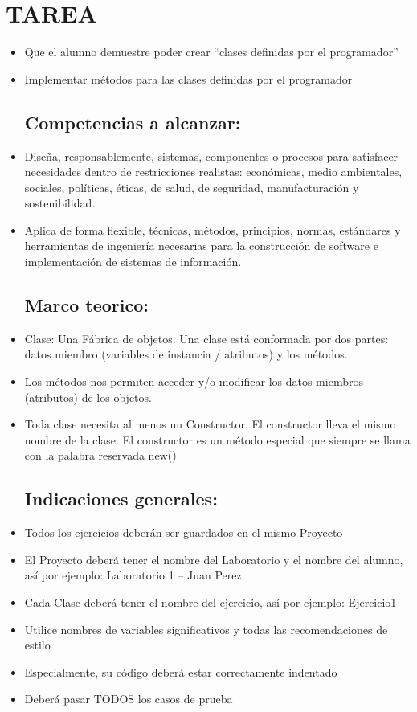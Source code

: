 \documentclass{article}
\begin{document}
    \section{TAREA}
	\begin{itemize}	
    \subsection{Objetivos:}
		\item Que el alumno demuestre poder crear  “clases definidas por el programador” 
		\item Implementar métodos para las clases definidas por el programador
       
    \subsection{Competencias a alcanzar:}
		\item Diseña, responsablemente, sistemas, componentes o procesos para satisfacer necesidades dentro de restricciones realistas: económicas, medio ambientales, sociales, políticas, éticas, de salud, de seguridad, manufacturación y sostenibilidad.
        \item Aplica de forma flexible, técnicas, métodos, principios, normas, estándares y herramientas de ingeniería necesarias para la construcción de software e implementación de sistemas de información.
    \subsection{Marco teorico:}
        \item Clase: Una Fábrica de objetos. Una clase está conformada por dos partes: datos miembro (variables de instancia / atributos) y los métodos. 
        \item Los métodos nos permiten acceder y/o modificar los datos miembros (atributos) de los objetos. 
        \item Toda clase necesita al menos un Constructor. El constructor lleva el mismo nombre de la clase. El constructor es un método especial que siempre se llama con la palabra reservada new() 
        
    \subsection{Indicaciones generales:}
        \item Todos los ejercicios deberán ser guardados en el mismo Proyecto
        \item El Proyecto deberá tener el nombre del Laboratorio y el nombre del alumno, así por ejemplo: Laboratorio 1 – Juan Perez
        \item Cada Clase deberá tener el nombre del ejercicio, así por ejemplo: Ejercicio1
        \item Utilice nombres de variables significativos y todas las recomendaciones de estilo
        \item Especialmente, su código deberá estar correctamente indentado
        \item Deberá pasar TODOS los casos de prueba
	\end{itemize}
\end{document}
